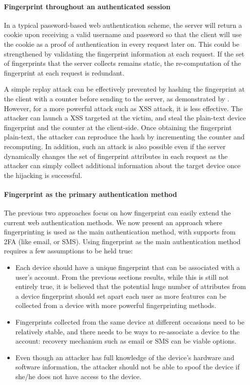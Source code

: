 \documentclass{acm_proc_article-sp}
\begin{document}
\paragraph{Fingerprint throughout an authenticated session}
In a typical password-based web authentication scheme, the server will return a cookie upon receiving a valid username and password so that the client will use the cookie as a proof of authentication in every request later on. This could be strengthened by validating the fingerprint information at each request. If the set of fingerprints that the server collects remains static, the re-computation of the fingerprint at each request is redundant.

A simple replay attack can be effectively prevented by hashing the fingerprint at the client with a counter before sending to the server, as demonstrated by \cite{preu:smart}. However, for a more powerful attack such as XSS attack, it is less effective. The attacker can launch a XSS targeted at the victim, and steal the plain-text device fingerprint and the counter at the client-side. Once obtaining the fingerprint plain-text, the attacker can reproduce the hash by incrementing the counter
and recomputing. In addition, such an attack is also possible even if the server dynamically changes the set of fingerprint attributes in each request \cite{unger:shpf} as the attacker can simply collect additional information about the target device once the hijacking is successful.

\paragraph{ Fingerprint as the primary authentication method}
The previous two approaches focus on how fingerprint can easily extend the current web authentication methods. We now present an approach where fingerprinting is used as the main authentication method, with supports from 2FA (like email, or SMS). 
Using fingerprint as the main authentication method requires a few assumptions to be held true: 
\begin{itemize}
    \item Each device should have a unique fingerprint that can be associated with a user's account. From the previous sections results, while this is still not entirely true, it is believed that the potential huge number of attributes from a device fingerprint should set apart each user as more features can be collected from a device with more powerful fingerprinting methods. 
    \item Fingerprints collected from the same device at different occasions need to be relatively stable, and there needs to be ways to re-associate a device to the account: recovery mechanism such as email or SMS can be viable options. 
    \item Even though an attacker has full knowledge of the device's hardware and software information, the attacker should not be able to spoof the device if she/he does not have access to the device. 
\end{itemize}
\end{document}
